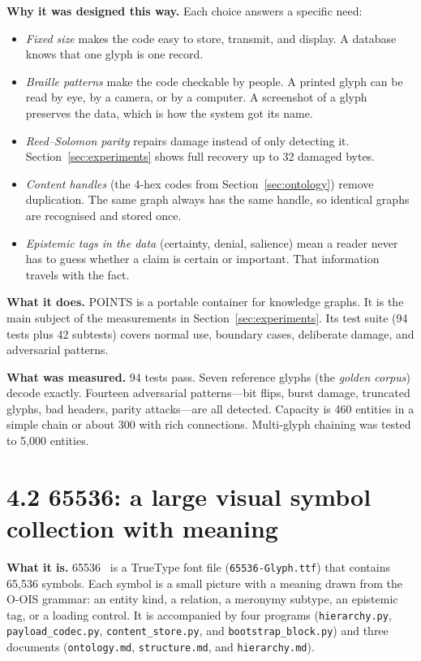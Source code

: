 \textbf{Why it was designed this way.} Each choice answers a specific need:

\begin{itemize}
\item \textit{Fixed size} makes the code easy to store, transmit, and display. A database knows that one glyph is one record.
\item \textit{Braille patterns} make the code checkable by people. A printed glyph can be read by eye, by a camera, or by a computer. A screenshot of a glyph preserves the data, which is how the system got its name.
\item \textit{Reed--Solomon parity} repairs damage instead of only detecting it. Section~\ref{sec:experiments} shows full recovery up to 32 damaged bytes.
\item \textit{Content handles} (the 4-hex codes from Section~\ref{sec:ontology}) remove duplication. The same graph always has the same handle, so identical graphs are recognised and stored once.
\item \textit{Epistemic tags in the data} (certainty, denial, salience) mean a reader never has to guess whether a claim is certain or important. That information travels with the fact.
\end{itemize}

\textbf{What it does.} POINTS is a portable container for knowledge graphs. It is the main subject of the measurements in Section~\ref{sec:experiments}. Its test suite (94 tests plus 42 subtests) covers normal use, boundary cases, deliberate damage, and adversarial patterns.

\textbf{What was measured.} 94 tests pass. Seven reference glyphs (the \textit{golden corpus}) decode exactly. Fourteen adversarial patterns---bit flips, burst damage, truncated glyphs, bad headers, parity attacks---are all detected. Capacity is 460 entities in a simple chain or about 300 with rich connections. Multi-glyph chaining was tested to 5,000 entities.

\section*{4.2 65536: a large visual symbol collection with meaning}

\textbf{What it is.} 65536~\cite{65536_2026} is a TrueType font file (\texttt{65536-Glyph.ttf}) that contains 65,536 symbols. Each symbol is a small picture with a meaning drawn from the O-OIS grammar: an entity kind, a relation, a meronymy subtype, an epistemic tag, or a loading control. It is accompanied by four programs (\texttt{hierarchy.py}, \texttt{payload\_codec.py}, \texttt{content\_store.py}, and \texttt{bootstrap\_block.py}) and three documents (\texttt{ontology.md}, \texttt{structure.md}, and \texttt{hierarchy.md}).

